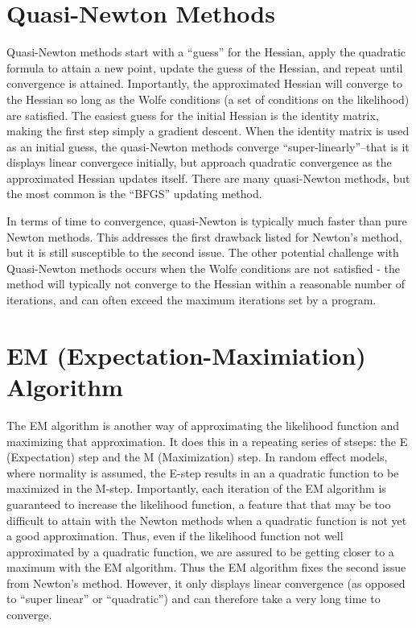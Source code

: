 \documentclass[
  letterpaper,
  DIV=11,
  numbers=noendperiod]{scrreprt}
\begin{document}
\hypertarget{quasi-newton-methods}{%
\section{Quasi-Newton Methods}\label{quasi-newton-methods}}

Quasi-Newton methods start with a ``guess'' for the Hessian, apply the
quadratic formula to attain a new point, update the guess of the
Hessian, and repeat until convergence is attained. Importantly, the
approximated Hessian will converge to the Hessian so long as the Wolfe
conditions (a set of conditions on the likelihood) are satisfied. The
easiest guess for the initial Hessian is the identity matrix, making the
first step simply a gradient descent. When the identity matrix is used
as an initial guess, the quasi-Newton methods converge
``super-linearly''--that is it displays linear convergece initially, but
approach quadratic convergence as the approximated Hessian updates
itself. There are many quasi-Newton methods, but the most common is the
``BFGS'' updating method.

In terms of time to convergence, quasi-Newton is typically much faster
than pure Newton methods. This addresses the first drawback listed for
Newton's method, but it is still susceptible to the second issue. The
other potential challenge with Quasi-Newton methods occurs when the
Wolfe conditions are not satisfied - the method will typically not
converge to the Hessian within a reasonable number of iterations, and
can often exceed the maximum iterations set by a program.

\hypertarget{em-expectation-maximiation-algorithm}{%
\section{EM (Expectation-Maximiation)
Algorithm}\label{em-expectation-maximiation-algorithm}}

The EM algorithm is another way of approximating the likelihood function
and maximizing that approximation. It does this in a repeating series of
stseps: the E (Expectation) step and the M (Maximization) step. In
random effect models, where normality is assumed, the E-step results in
an a quadratic function to be maximized in the M-step. Importantly, each
iteration of the EM algorithm is guaranteed to increase the likelihood
function, a feature that that may be too difficult to attain with the
Newton methods when a quadratic function is not yet a good
approximation. Thus, even if the likelihood function not well
approximated by a quadratic function, we are assured to be getting
closer to a maximum with the EM algorithm. Thus the EM algorithm fixes
the second issue from Newton's method. However, it only displays linear
convergence (as opposed to ``super linear'' or ``quadratic'') and can
therefore take a very long time to converge.
\end{document}
